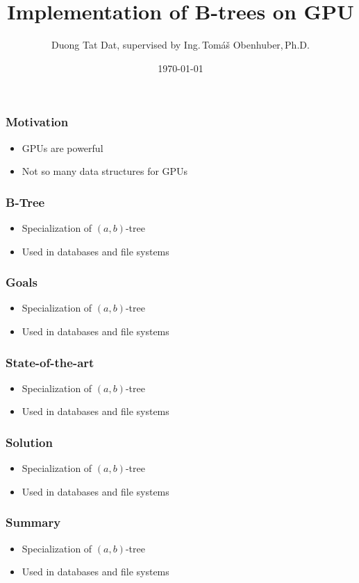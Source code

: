 \documentclass{beamer}
\title{Implementation of B-trees on GPU}
\author{Duong Tat Dat, supervised by Ing.\,Tomáš Obenhuber,\,Ph.D.}
\institute{Czech Technical University in Prague, Faculty of Information Technology}
\date{\today}
\begin{document}

\begin{frame}
  \vspace*{2em}
  \titlepage
\end{frame}

\begin{frame}
  \frametitle{Motivation}
  \begin{itemize}
    \item GPUs are powerful
    \item Not so many data structures for GPUs
  \end{itemize}
\end{frame}

\begin{frame}
  \frametitle{B-Tree}
  \begin{itemize}
    \item Specialization of $(a,b)$-tree
    \item Used in databases and file systems
  \end{itemize}
\end{frame}

\begin{frame}
  \frametitle{Goals}
  \begin{itemize}
    \item Specialization of $(a,b)$-tree
    \item Used in databases and file systems
  \end{itemize}
\end{frame}

\begin{frame}
  \frametitle{State-of-the-art}
  \begin{itemize}
    \item Specialization of $(a,b)$-tree
    \item Used in databases and file systems
  \end{itemize}
\end{frame}

\begin{frame}
  \frametitle{Solution}
  \begin{itemize}
    \item Specialization of $(a,b)$-tree
    \item Used in databases and file systems
  \end{itemize}
\end{frame}

\begin{frame}
  \frametitle{Summary}
  \begin{itemize}
    \item Specialization of $(a,b)$-tree
    \item Used in databases and file systems
  \end{itemize}
\end{frame}
\end{document}
